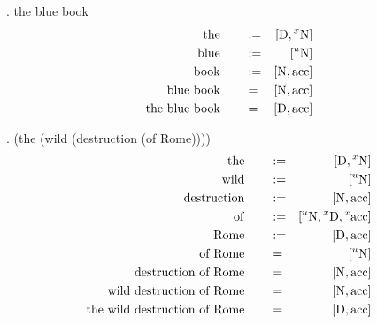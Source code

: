 \documentclass{article}
\begin{document}
\ex. the blue book
\begin{align}
\syndef{the}{[D,\ux{N}]}\\
\syndef{blue}{[\un{N}]}\\
\syndef{book}{[N,acc]}\\
\syncomp{\text{blue book}}{[N,acc]}\\
\syncomp{\text{the blue book}}{[D,acc]}\\
\end{align}

\ex. (the (wild (destruction (of Rome))))
\begin{align}
\syndef{the}{[D,\ux{N}]}\\
\syndef{wild}{[\un{N}]}\\
\syndef{destruction}{[N,acc]}\\
\syndef{of}{[\un{N},\ux{D},\ux{acc}]}\\
\syndef{Rome}{[D,acc]}\\
\syncomp{\text{of Rome}}{[\un{N}]}\\
\syncomp{\text{destruction of Rome}}{[N,acc]}\\
\syncomp{\text{wild destruction of Rome}}{[N,acc]}\\
\syncomp{\text{the wild destruction of Rome}}{[D,acc]}
\end{align}
\end{document}
